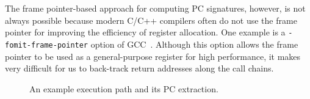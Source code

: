 
The frame pointer-based approach for computing PC signatures, however, is not
always possible because modern C/C++ compilers often do not use the frame
pointer for improving the efficiency of register allocation.
One example is a
{\tt -fomit-frame-pointer} option of GCC~\cite{GCC}. 
Although this option allows the frame pointer to be used as a general-purpose
register for high performance, it makes very difficult for us to back-track
return addresses along the call chains.  

\begin{figure}[b]
	\centering
	\vspace{-16pt}
	\vspace{-10pt}
	\hfill
	\vspace{-10pt}
	\caption{An example execution path and its PC extraction.} %
	\label{fig:getpc}
\end{figure}

